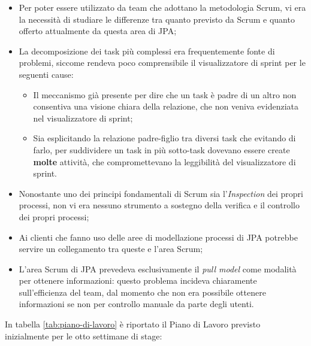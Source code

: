 \begin{itemize}
\item Per poter essere utilizzato da team che adottano la metodologia Scrum,
  vi era la necessità di studiare le differenze tra quanto previsto da Scrum e
  quanto offerto attualmente da questa area di JPA;
\item La decomposizione dei task più complessi era frequentemente fonte di
  problemi, siccome rendeva poco comprensibile il visualizzatore di sprint per
  le seguenti cause:
  \begin{itemize}
  \item Il meccanismo già presente per dire che un task è padre di un altro non
    consentiva una visione chiara della relazione, che non veniva evidenziata
    nel visualizzatore di sprint;
  \item Sia esplicitando la relazione padre-figlio tra diversi task che
    evitando di farlo, per suddividere un task in più sotto-task dovevano
    essere create \textbf{molte} attività, che compromettevano la leggibilità
    del visualizzatore di sprint.
  \end{itemize}
\item Nonostante uno dei principi fondamentali di Scrum sia l'\emph{Inspection}
  dei propri processi, non vi era nessuno strumento a sostegno della verifica
  e il controllo dei propri processi;
\item Ai clienti che fanno uso delle aree di modellazione processi di JPA
  potrebbe servire un collegamento tra queste e l'area Scrum;
\item L'area Scrum di JPA prevedeva esclusivamente il \emph{pull model} come
  modalità per ottenere informazioni: questo problema incideva chiaramente
  sull'efficienza del team, dal momento che non era possibile ottenere
  informazioni se non per controllo manuale da parte degli utenti.
\end{itemize}

In tabella \ref{tab:piano-di-lavoro} è riportato il Piano di Lavoro previsto
inizialmente per le otto settimane di stage: \\

